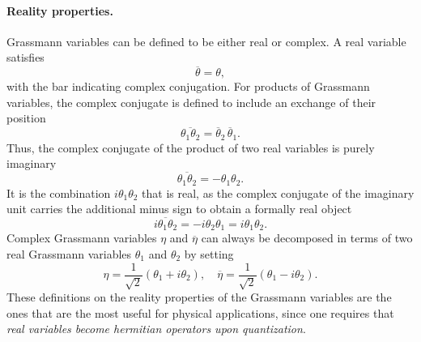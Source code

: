 \paragraph{Reality properties.}
Grassmann variables can be defined to be either real or complex. A real variable satisfies
\[
    \overline{\theta} = \theta,
\]
with the bar indicating complex conjugation. For products of Grassmann variables, the complex conjugate is defined to include an exchange of their position
\[
    \overline{\theta_1 \theta_2} = \overline{\theta}_2 \, \overline{\theta}_1.
\]
Thus, the complex conjugate of the product of two real variables is purely imaginary
\[
    \overline{\theta_1 \theta_2} = - \theta_1 \theta_2.
\]
It is the combination \(i \theta_1 \theta_2\) that is real, as the complex conjugate of the imaginary unit carries the additional minus sign to obtain a formally real object
\[
    \overline{i \theta_1 \theta_2} = -i \theta_2 \theta_1 = i \theta_1 \theta_2.
\]
Complex Grassmann variables \(\eta\) and \(\overline{\eta}\) can always be decomposed in terms of two real Grassmann variables \(\theta_1\) and \(\theta_2\) by setting
\[
    \eta = \frac{1}{\sqrt{2}} (\theta_1 + i \theta_2), \quad \overline{\eta} = \frac{1}{\sqrt{2}} (\theta_1 - i \theta_2).
\]
These definitions on the reality properties of the Grassmann variables are the ones that are the most useful for physical applications, since one requires that \textit{real variables become hermitian operators upon quantization}.

